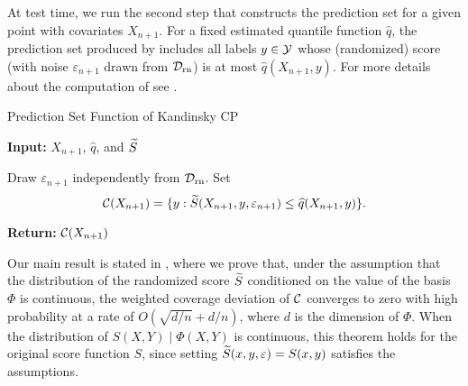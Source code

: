 At test time, we run the second step that constructs the prediction set for a given point with covariates $X_{n+1}$. For a fixed estimated quantile function $\hat q$, the prediction set produced by  includes all labels $y \in {\cal Y}$ whose (randomized) score (with noise $\varepsilon_{n+1}$ drawn from ${\cal D}_{\text{rn}}$) is at most $\hat{ q}(X_{n+1},y)$. For more details about the computation of  see .
\begin{comment}
\begin{align}
    \calC(X_{n+1}) \coloneqq \{y: \tS(S(X_{n+1},y), 
        \varepsilon_{n+1}) \leq \hat{q}(X_{n+1},y)\}.
    \label{eq:pred_set}
\end{align}
\end{comment}
\begin{algorithm}
\caption{Prediction Set Function of Kandinsky CP}
\label{alg:pred_set}
\textbf{Input:} $X_{n+1}$, $\hat{q}$, and ${\widetilde{S}}$
    \begin{algorithmic}[1]
    \STATE Draw $\varepsilon_{n+1}$ independently from ${\cal D}_{\text{rn}}$.
    \STATE Set
    $$
        {\cal C}(X_{n+1}) = \{y: {\widetilde{S}}(X_{n+1},y, 
        \varepsilon_{n+1}) \leq \widehat{q}(X_{n+1},y)\}.$$
   
\end{algorithmic}
\textbf{Return:} ${\cal C}(X_{n+1})$
\end{algorithm}

Our main result is stated in , where we prove that, under the assumption that the distribution of the randomized score ${\widetilde{S}}$ conditioned on the value of the basis $\Phi$ is continuous, the weighted coverage deviation of ${\cal C}$ converges to zero with high probability at a rate of $O(\sqrt{d/n}+d/n)$, where $d$ is the dimension of $\Phi$. When the distribution of $S(X,Y)\mid\Phi(X,Y)$ is continuous, this theorem holds for the original score function $S$, since setting ${\widetilde{S}}(x,y,\varepsilon) = S(x,y)$ satisfies the assumptions.


